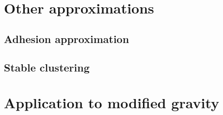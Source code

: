 \section{Other approximations}
\subsection{Adhesion approximation}
\subsection{Stable clustering}

\section{Application to modified gravity}